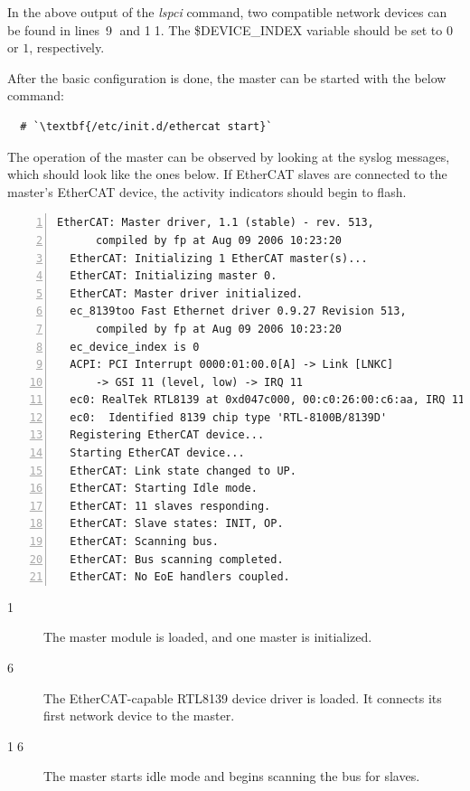\documentclass[a4paper,12pt,BCOR6mm,bibtotoc,idxtotoc]{scrbook}
\begin{document}
In the above output of the \textit{lspci} command, two compatible
network devices can be found in lines~\textcircled{\tiny 9} and
\textcircled{\tiny 11}. The \$DEVICE\_INDEX variable should be set to
$0$ or $1$, respectively.

After the basic configuration is done, the master can be started with
the below command:

\begin{lstlisting}
  # `\textbf{/etc/init.d/ethercat start}`
\end{lstlisting}

The operation of the master can be observed by looking at the
syslog messages, which should look like the ones below.
If EtherCAT slaves are connected to the master's EtherCAT device, the
activity indicators should begin to flash.

\begin{lstlisting}[numbers=left]
  EtherCAT: Master driver, 1.1 (stable) - rev. 513,
      compiled by fp at Aug 09 2006 10:23:20
  EtherCAT: Initializing 1 EtherCAT master(s)...
  EtherCAT: Initializing master 0.
  EtherCAT: Master driver initialized.
  ec_8139too Fast Ethernet driver 0.9.27 Revision 513,
      compiled by fp at Aug 09 2006 10:23:20
  ec_device_index is 0
  ACPI: PCI Interrupt 0000:01:00.0[A] -> Link [LNKC]
      -> GSI 11 (level, low) -> IRQ 11
  ec0: RealTek RTL8139 at 0xd047c000, 00:c0:26:00:c6:aa, IRQ 11
  ec0:  Identified 8139 chip type 'RTL-8100B/8139D'
  Registering EtherCAT device...
  Starting EtherCAT device...
  EtherCAT: Link state changed to UP.
  EtherCAT: Starting Idle mode.
  EtherCAT: 11 slaves responding.
  EtherCAT: Slave states: INIT, OP.
  EtherCAT: Scanning bus.
  EtherCAT: Bus scanning completed.
  EtherCAT: No EoE handlers coupled.
\end{lstlisting}

\begin{description}
\item[\normalfont\textcircled{\tiny 1}] The master module is loaded,
  and one master is initialized.
\item[\normalfont\textcircled{\tiny 6}] The EtherCAT-capable RTL8139
  device driver is loaded. It connects its first network device to the
  master.
\item[\normalfont\textcircled{\tiny 16}] The master starts idle mode
  and begins scanning the bus for slaves.
\end{description}

\end{document}
